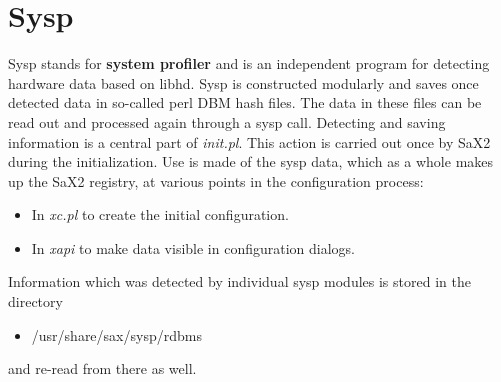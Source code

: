 \chapter{Sysp}
\label{cha:sys}
\minitoc

Sysp stands for \textbf{system profiler} and is an independent program for 
detecting hardware data based on libhd.
Sysp is constructed modularly and saves once detected data in so-called perl 
DBM hash files. The data in these files can be read out and processed again
through a sysp call. Detecting and saving information is a central part of
\textit{init.pl}.
This action is carried out once by SaX2 during the initialization. Use is made
of the sysp data, which as a whole makes up the SaX2 registry, at various
points in the configuration process:
\begin{itemize}
\item In \textit{xc.pl} to create the initial configuration.
\item In \textit{xapi} to make data visible in configuration dialogs.
\end{itemize} 
Information which was detected by individual sysp modules is stored in the
directory 
\begin{itemize}
\item /usr/share/sax/sysp/rdbms
\end{itemize}
and re-read from there as well.

